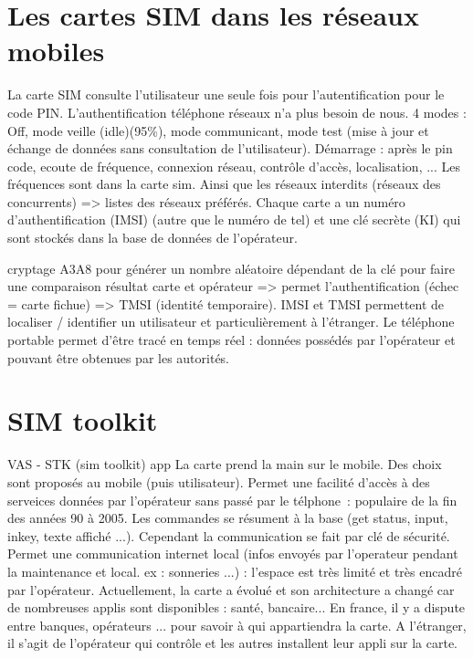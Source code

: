 \documentclass[a4paper,12pt]{article}
\begin{document}
\section{Les cartes SIM dans les réseaux mobiles}

La carte SIM consulte l'utilisateur une seule fois pour l'autentification pour le code PIN. L'authentification téléphone réseaux n'a plus besoin de nous.
4 modes : Off, mode veille (idle)(95\%), mode communicant, mode test (mise à jour et échange de données sans consultation de l'utilisateur).
Démarrage : après le pin code, ecoute de fréquence, connexion réseau, contrôle d'accès, localisation, ...
Les fréquences sont dans la carte sim. Ainsi que les réseaux interdits (réseaux des concurrents) => listes des réseaux préférés.
Chaque carte a un numéro d'authentification (IMSI) (autre que le numéro de tel) et une clé secrète (KI) qui sont stockés dans la base de données de l'opérateur.

cryptage A3A8 pour générer un nombre aléatoire dépendant de la clé pour faire une comparaison résultat carte et opérateur => permet l'authentification (échec = carte fichue) => TMSI (identité temporaire).
IMSI et TMSI permettent de localiser / identifier un utilisateur et particulièrement à l'étranger.
Le téléphone portable permet d'être tracé en temps réel : données possédés par l'opérateur et pouvant être obtenues par les autorités.

\section{SIM toolkit}

VAS - STK (sim toolkit) app
La carte prend la main sur le mobile.
Des choix sont proposés au mobile (puis utilisateur).
Permet une facilité d'accès à des serveices données par l'opérateur sans passé par le télphone~:
	populaire de la fin des années 90 à 2005.
	Les commandes se résument à la base (get status, input, inkey, texte affiché ...).
	Cependant la communication se fait par clé de sécurité.
	Permet une communication internet local (infos envoyés par l'operateur pendant la maintenance et local. ex : sonneries ...) : l'espace est très limité et très encadré par l'opérateur.
Actuellement, la carte a évolué et son architecture a changé car de nombreuses applis sont disponibles : santé, bancaire...
En france, il y a dispute entre banques, opérateurs ... pour savoir à qui appartiendra la carte. A l'étranger, il s'agit de l'opérateur qui contrôle et les autres installent leur appli sur la carte.
\end{document}
